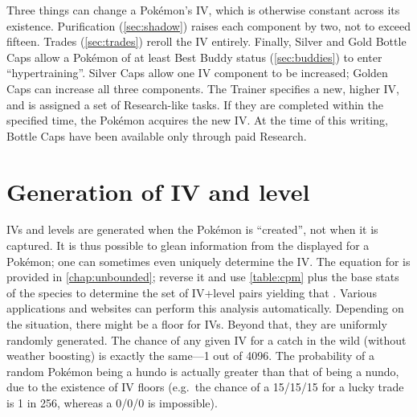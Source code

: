 Three things can change a Pokémon's IV, which is otherwise constant across its existence.
Purification (\autoref{sec:shadow}) raises each component by two, not to exceed fifteen.
Trades (\autoref{sec:trades}) reroll the IV entirely.
Finally, Silver and Gold Bottle Caps allow a Pokémon of at least Best Buddy status (\autoref{sec:buddies})
  to enter ``hypertraining''.
Silver Caps allow one IV component to be increased; Golden Caps can increase all three components.
The Trainer specifies a new, higher IV, and is assigned a set of Research-like tasks.
If they are completed within the specified time, the Pokémon acquires the new IV.
At the time of this writing, Bottle Caps have been available only through paid Research.

\section{Generation of IV and level\label{sec:ivgeneration}}
IVs and levels are generated when the Pokémon is ``created'', not when it is captured.
It is thus possible to glean information from the \CP{} displayed for a Pokémon;
  one can sometimes even uniquely determine the IV\@.
The equation for \CP{} is provided in \autoref{chap:unbounded}; reverse it and
  use \autoref{table:cpm} plus the base stats of the species to determine
  the set of IV+level pairs yielding that \CP\@.
Various applications and websites can perform this analysis automatically.
Depending on the situation, there might be a floor for IVs.
Beyond that, they are uniformly randomly generated.
The chance of any given IV for a catch in the wild (without weather boosting)
  is exactly the same---1 out of 4096.
The probability of a random Pokémon being a hundo is actually
  greater than that of being a nundo, due to the existence of IV floors
  (e.g.\ the chance of a 15/15/15 for a lucky trade is 1 in 256, whereas
  a 0/0/0 is impossible).
